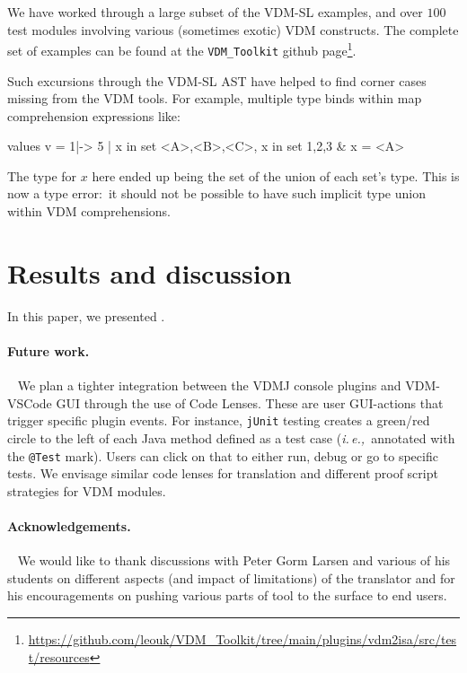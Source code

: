 \documentclass[runningheads,a4paper]{llncs}
\newcommand{\ie}{{\em i.\,e.,\/}}
\begin{document}
We have worked through a large subset of the VDM-SL examples, and over \(100\) test modules involving various (sometimes exotic) VDM constructs. The complete set of examples can be found at the \texttt{VDM\_Toolkit} github page\footnote{\url{https://github.com/leouk/VDM_Toolkit/tree/main/plugins/vdm2isa/src/test/resources}}.

Such excursions through the VDM-SL AST have helped to find corner cases missing from the VDM tools. For example, multiple type binds within map comprehension expressions like:
% 
\begin{vdmsl}[frame=none,basicstyle=\ttfamily\scriptsize]
    values 
        v = { 1|-> 5 | x in set {<A>,<B>,<C>}, x in set {1,2,3} & x = <A> }
\end{vdmsl}
%
The type for \(x\) here ended up being the set of the union of each set's type. This is now a type error:~it should not be possible to have such implicit type union within VDM comprehensions. 

\section{Results and discussion}\label{sec:Results}

In this paper, we presented .

\paragraph*{Future work.}~
%
We plan a tighter integration between the VDMJ console plugins and VDM-VSCode GUI through the use of Code Lenses. These are user GUI-actions that trigger specific plugin events. For instance, \texttt{jUnit} testing creates a green/red circle to the left of each Java method defined as a test case (\ie~annotated with the \texttt{@Test} mark). Users can click on that to either run, debug or go to specific tests. We envisage similar code lenses for translation and different proof script strategies for VDM modules.     

\paragraph*{Acknowledgements.}~
%
We would like to thank discussions with Peter Gorm Larsen and various of his students on different aspects (and impact of limitations) of the translator and for his encouragements on pushing various parts of tool to the surface to end users.


%


\end{document}
